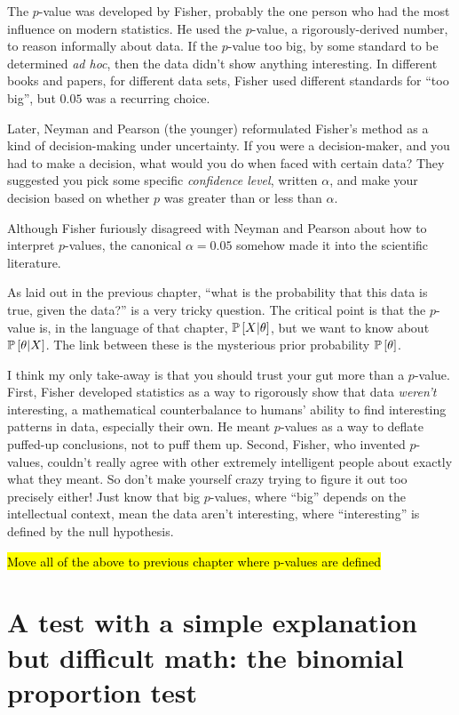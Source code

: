 The $p$-value was developed by Fisher, probably the one person who had the most influence on modern statistics. He used the $p$-value, a rigorously-derived number, to reason informally about data. If the $p$-value too big, by some standard to be determined \textit{ad hoc}, then the data didn't show anything interesting. In different books and papers, for different data sets, Fisher used different standards for ``too big'', but $0.05$ was a recurring choice.

Later, Neyman and Pearson (the younger) reformulated Fisher's method as a kind
of decision-making under uncertainty. If you were a decision-maker, and you had
to make a decision, what would you do when faced with certain data? They
suggested you pick some specific \emph{confidence level}, written $\alpha$, and
make your decision based on whether $p$ was greater than or less than $\alpha$.

Although Fisher furiously disagreed with Neyman and Pearson about how to interpret $p$-values, the canonical $\alpha = 0.05$ somehow made it into the scientific literature.

As laid out in the previous chapter, ``what is the probability that this data is true, given the data?'' is a very tricky question. The critical point is that the $p$-value is, in the language of that chapter, $\mathbb{P}\left[{X | \theta}\right]$, but we want to know about $\mathbb{P}\left[{\theta | X}\right]$. The link between these is the mysterious prior probability $\mathbb{P}\left[{\theta}\right]$.

I think my only take-away is that you should trust your gut more than a $p$-value. First, Fisher developed statistics as a way to rigorously show that data \emph{weren't} interesting, a mathematical counterbalance to humans' ability to find interesting patterns in data, especially their own. He meant $p$-values as a way to deflate puffed-up conclusions, not to puff them up. Second, Fisher, who invented $p$-values, couldn't really agree with other extremely intelligent people about exactly what they meant. So don't make yourself crazy trying to figure it out too precisely either! Just know that big $p$-values, where ``big'' depends on the intellectual context, mean the data aren't interesting, where ``interesting'' is defined by the null hypothesis.

\hl{Move all of the above to previous chapter where p-values are defined}

\section{A test with a simple explanation but difficult math: the binomial proportion test}


